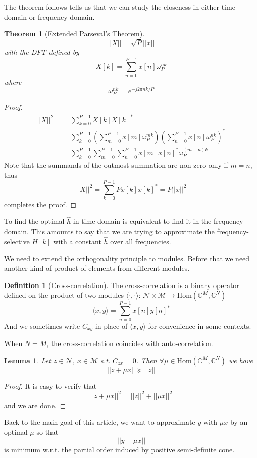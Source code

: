 \documentclass[12pt]{article}
\newtheorem{lemma}{Lemma}
\newtheorem{theorem}{Theorem}
\theoremstyle{definition}
\newtheorem{definition}{Definition}
\begin{document}
The theorem follows tells us that we can study the closeness in either time domain or frequency domain.
\begin{theorem}[Extended Parseval's Theorem]\label{thm parseval}
	$$||X||=\sqrt{P}||x||$$
	with the DFT defined by
	$$X[k]=\sum_{n=0}^{P-1}x[n]\omega_P^{nk}$$
	where
	$$\omega_P^{nk}=e^{-j2\pi nk/P}$$
\end{theorem}
\begin{proof}
	\begin{eqnarray*}
	||X||^2&=&\sum_{k=0}^{P-1}X[k]X[k]^*\\
	&=&\sum_{k=0}^{P-1}\left(\sum_{m=0}^{P-1}x[m]\omega_P^{mk} \right)\left(\sum_{n=0}^{P-1}x[n]\omega_P^{nk} \right)^*\\
	&=&\sum_{k=0}^{P-1}\sum_{m=0}^{P-1}\sum_{n=0}^{P-1}x[m]x[n]^*\omega_P^{(m-n)k}
	\end{eqnarray*}
Note that the summands of the outmost summation are non-zero only if $m=n$, thus
$$||X||^2=\sum_{k=0}^{P-1}Px[k]x[k]^*=P||x||^2$$
completes the proof.
\end{proof}
To find the optimal $\hat{h}$ in time domain is equivalent to find it in the frequency domain. This amounts to say that we are trying to approximate the frequency-selective $H[k]$ with a constant $\hat{h}$ over all frequencies.

We need to extend the orthogonality principle to modules. Before that we need another kind of product of elements from different modules.
\begin{definition}[Cross-correlation]\label{def crosscorrelation}
	The cross-correlation is a binary operator defined on the product of two modules $\langle\cdot,\cdot\rangle$: $\mathcal{N}\times \mathcal{M}\rightarrow\mbox{Hom}\left(\mathbb{C}^M,\mathbb{C}^N \right)$
	$$\langle x,y\rangle=\sum_{n=0}^{P-1}x[n]y[n]^*$$
	And we sometimes write $C_{xy}$ in place of $\langle x,y\rangle$ for convenience in some contexts.
\end{definition}
When $N=M$, the cross-correlation coincides with auto-correlation.
\begin{lemma}\label{lemma |z+mux|>=|z|}
	Let $z\in\mathcal{N}$, $x\in\mathcal{M}$ s.t. $C_{zx}=0$. Then $\forall \mu\in\mbox{Hom}\left(\mathbb{C}^M,\mathbb{C}^N \right)$ we have
	$$||z+\mu x||\succeq||z||$$
\end{lemma}
\begin{proof}
	It is easy to verify that
	$$||z+\mu x||^2=||z||^2+||\mu x||^2$$
	and we are done.
\end{proof}
Back to the main goal of this article, we want to approximate $y$ with $\mu x$ by an optimal $\mu$ so that
$$||y-\mu x||$$
is minimum w.r.t. the partial order induced by positive semi-definite cone.
\end{document}
